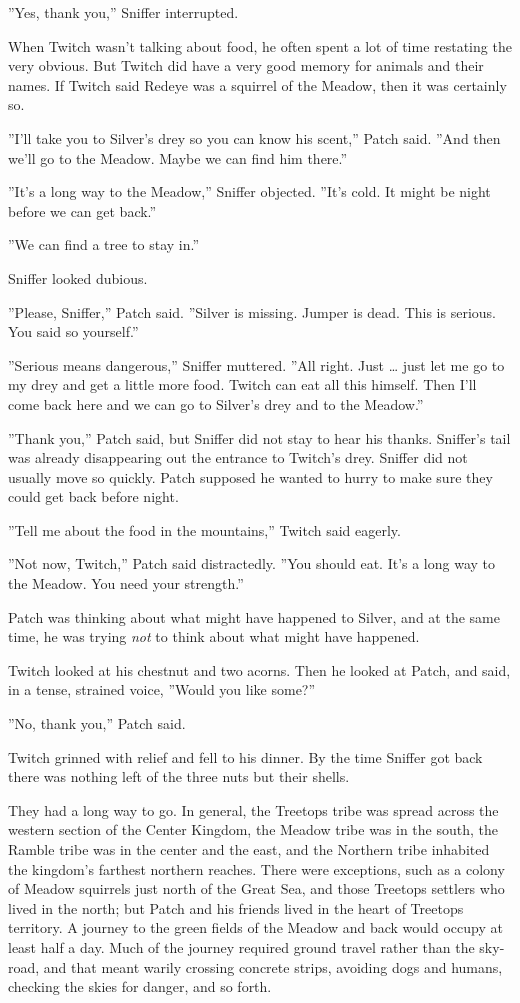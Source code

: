 \documentclass[12pt]{book}
\begin{document}
''Yes, thank you,'' Sniffer interrupted.

When Twitch wasn't talking about food, he often spent a lot of time
restating the very obvious. But Twitch did have a very good memory for
animals and their names. If Twitch said Redeye was a squirrel of the
Meadow, then it was certainly so.

''I'll take you to Silver's drey so you can know his scent,'' Patch
said. ''And then we'll go to the Meadow. Maybe we can find him
there.''

''It's a long way to the Meadow,'' Sniffer objected. ''It's cold. It
might be night before we can get back.''

''We can find a tree to stay in.''

Sniffer looked dubious.

''Please, Sniffer,'' Patch said. ''Silver is missing. Jumper is
dead. This is serious. You said so yourself.''

''Serious means dangerous,'' Sniffer muttered. ''All right. Just
\ldots{} just let me go to my drey and get a little more food. Twitch
can eat all this himself. Then I'll come back here and we can go to
Silver's drey and to the Meadow.''

''Thank you,'' Patch said, but Sniffer did not stay to hear his
thanks. Sniffer's tail was already disappearing out the entrance to
Twitch's drey. Sniffer did not usually move so quickly. Patch supposed
he wanted to hurry to make sure they could get back before night.

''Tell me about the food in the mountains,'' Twitch said eagerly.

''Not now, Twitch,'' Patch said distractedly. ''You should eat. It's a
long way to the Meadow. You need your strength.''

Patch was thinking about what might have happened to Silver, and at
the same time, he was trying \textit{not} to think about what might
have happened.

Twitch looked at his chestnut and two acorns. Then he looked at Patch,
and said, in a tense, strained voice, ''Would you like some?''

''No, thank you,'' Patch said.

Twitch grinned with relief and fell to his dinner. By the time Sniffer
got back there was nothing left of the three nuts but their shells.

They had a long way to go. In general, the Treetops tribe was spread
across the western section of the Center Kingdom, the Meadow tribe was
in the south, the Ramble tribe was in the center and the east, and the
Northern tribe inhabited the kingdom's farthest northern
reaches. There were exceptions, such as a colony of Meadow squirrels
just north of the Great Sea, and those Treetops settlers who lived in
the north; but Patch and his friends lived in the heart of Treetops
territory. A journey to the green fields of the Meadow and back would
occupy at least half a day. Much of the journey required ground travel
rather than the sky-road, and that meant warily crossing concrete
strips, avoiding dogs and humans, checking the skies for danger, and
so forth.
\end{document}
